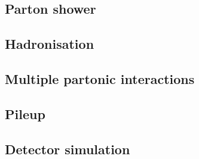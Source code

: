 
\subsection{Parton shower}
\subsection{Hadronisation}
\subsection{Multiple partonic interactions}
\subsection{Pileup}
\subsection{Detector simulation}
